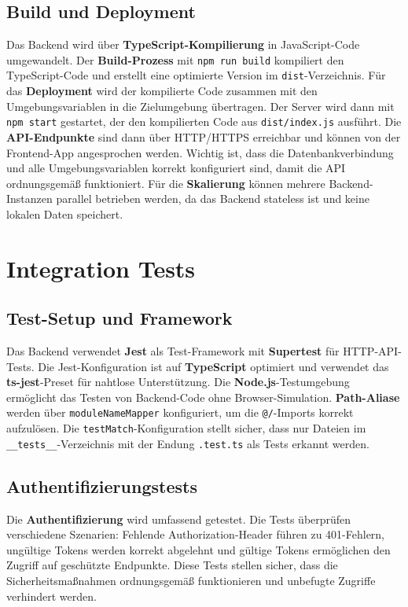 \subsection{Build und Deployment}

Das Backend wird über \textbf{TypeScript-Kompilierung} in JavaScript-Code umgewandelt. Der \textbf{Build-Prozess} mit \texttt{npm run build} kompiliert den TypeScript-Code und erstellt eine optimierte Version im \texttt{dist}-Verzeichnis. Für das \textbf{Deployment} wird der kompilierte Code zusammen mit den Umgebungsvariablen in die Zielumgebung übertragen. Der Server wird dann mit \texttt{npm start} gestartet, der den kompilierten Code aus \texttt{dist/index.js} ausführt. Die \textbf{API-Endpunkte} sind dann über HTTP/HTTPS erreichbar und können von der Frontend-App angesprochen werden. Wichtig ist, dass die Datenbankverbindung und alle Umgebungsvariablen korrekt konfiguriert sind, damit die API ordnungsgemäß funktioniert. Für die \textbf{Skalierung} können mehrere Backend-Instanzen parallel betrieben werden, da das Backend stateless ist und keine lokalen Daten speichert.



\section{Integration Tests}

\subsection{Test-Setup und Framework}

Das Backend verwendet \textbf{Jest} als Test-Framework mit \textbf{Supertest} für HTTP-API-Tests. Die Jest-Konfiguration ist auf \textbf{TypeScript} optimiert und verwendet das \textbf{ts-jest}-Preset für nahtlose Unterstützung. Die \textbf{Node.js}-Testumgebung ermöglicht das Testen von Backend-Code ohne Browser-Simulation. \textbf{Path-Aliase} werden über \texttt{moduleNameMapper} konfiguriert, um die \texttt{@/}-Imports korrekt aufzulösen. Die \texttt{testMatch}-Konfiguration stellt sicher, dass nur Dateien im \texttt{\_\_tests\_\_}-Verzeichnis mit der Endung \texttt{.test.ts} als Tests erkannt werden.

\subsection{Authentifizierungstests}

Die \textbf{Authentifizierung} wird umfassend getestet. Die Tests überprüfen verschiedene Szenarien: Fehlende Authorization-Header führen zu 401-Fehlern, ungültige Tokens werden korrekt abgelehnt und gültige Tokens ermöglichen den Zugriff auf geschützte Endpunkte. Diese Tests stellen sicher, dass die Sicherheitsmaßnahmen ordnungsgemäß funktionieren und unbefugte Zugriffe verhindert werden.

